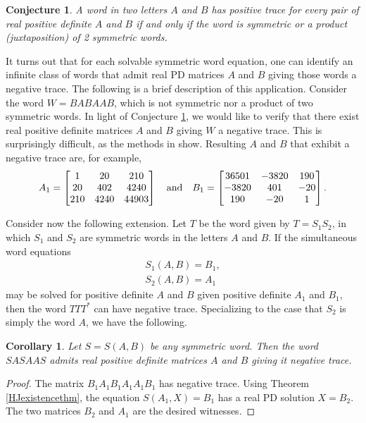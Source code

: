 \documentclass{amsart}
\newtheorem{cor}[thm]{Corollary}
\newtheorem{conj}[thm]{Conjecture}
\theoremstyle{definition}
\theoremstyle{remark}
\numberwithin{equation}{section}
\newcommand{\<}{\langle}
\renewcommand{\>}{\rangle}
\begin{document}
\begin{conj}\label{traceconjecture}
A word in two letters $A$ and $B$ has positive trace for every pair of real positive definite $A$ and $B$ if and only if the word is symmetric or a product (juxtaposition) of 2 symmetric words.
\end{conj}

It turns out that for each solvable symmetric word equation, one
can identify an infinite class of words that admit real PD
matrices $A$ and $B$ giving those words a negative trace.  
The following is a brief description of this application.  Consider the word $W = BABAAB$, which is not symmetric nor a product of two symmetric words. In light of Conjecture \ref{traceconjecture}, we would like to verify that there exist real positive definite matrices $A$ and $B$ giving $W$ a negative trace.  This is surprisingly difficult, as the methods in \cite{JH} show.  Resulting
$A$ and $B$ that exhibit a negative trace are, for example,
\[A_1=\left[\begin{array}{@{}ccc@{}}
1&20&210\\
20&402&4240\\
210&4240&44903
\end{array}\right]\quad \mbox{and}\quad B_1=\left[\begin{array}{@{}ccc@{}}
36501&-3820&190\\
-3820&401&-20\\
190&-20&1
\end{array}\right].\]

Consider now the following extension.  Let $T$ be the word given by $T=S_1S_2$, in which $S_1$ and $S_2$ are symmetric words in the letters $A$ and $B$.  If the simultaneous word equations
\[\begin{array}{c}
S_1(A,B)=B_1,\\[3pt]
S_2(A,B)=A_1
\end{array}\]
may be solved for positive definite $A$ and $B$ given positive
definite $A_1$ and $B_1$, then the word $TTT^{*}$ can have negative
trace.  Specializing to the case that $S_2$ is simply the word $A$, we have the following.

\begin{cor}
Let $S = S(A,B)$ be any symmetric word.  Then the word $SASAAS$ admits real positive definite matrices $A$ and $B$ giving it negative trace.
\end{cor}

\begin{proof}
The matrix $B_1A_1B_1A_1A_1B_1$ has negative trace.   Using Theorem \ref{HJexistencethm}, the  equation $S(A_1,X) = B_1$ has a real PD solution $X = B_2$.  The two matrices $B_2$ and $A_1$ are the desired witnesses.  
\end{proof}
\end{document}
